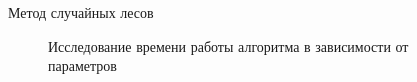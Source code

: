 \documentclass[12pt]{article}
\begin{document}
\begin{section}{Метод случайных лесов}
\begin{figure}[h!]
\begin{minipage}[h]{0.5\linewidth}
\end{minipage}
\hfill
\begin{minipage}[h]{0.5\linewidth}
\end{minipage}
\caption{Исследование времени  работы алгоритма в зависимости от параметров}
\label{ris:image1}
\end{figure}


\end{section}
\end{document}
